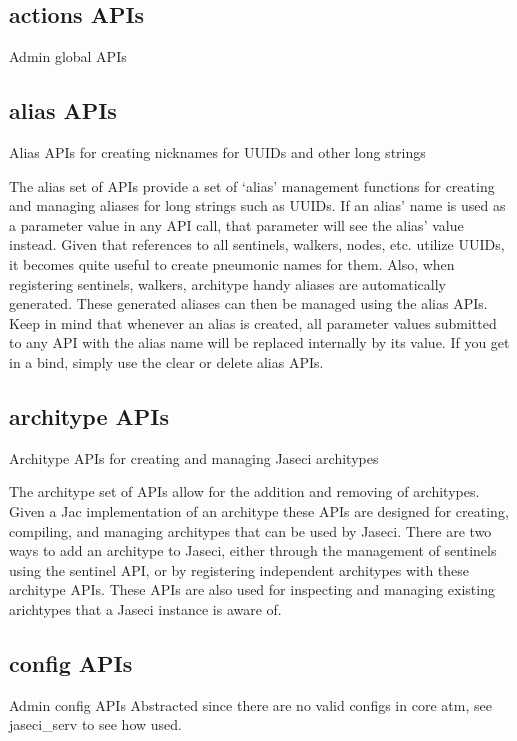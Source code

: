 \subsection{actions APIs}

Admin global APIs

\subsection{alias APIs}

Alias APIs for creating nicknames for UUIDs and other long strings
\par
The alias set of APIs provide a set of `alias' management functions for
creating and managing aliases for long strings such as UUIDs. If an alias'
name is used as a parameter value in any API call, that parameter will see
the alias' value instead. Given that references to all sentinels, walkers,
nodes, etc. utilize UUIDs, it becomes quite useful to create pneumonic
names for them. Also, when registering   sentinels, walkers, architype
handy aliases are automatically generated. These generated aliases can
then be managed using the alias APIs. Keep in mind that whenever an alias
is created, all parameter values submitted to any API with the alias name
will be replaced internally by its value. If you get in a bind, simply use
the clear or delete alias APIs.

\subsection{architype APIs}

Architype APIs for creating and managing Jaseci architypes
\par
The architype set of APIs allow for the addition and removing of
architypes. Given a Jac implementation of an architype these APIs are
designed for creating, compiling, and managing architypes that can be
used by Jaseci. There are two ways to add an architype to Jaseci, either
through the management of sentinels using the sentinel API, or by
registering independent architypes with these architype APIs. These
APIs are also used for inspecting and managing existing arichtypes that
a Jaseci instance is aware of.

\subsection{config APIs}

Admin config APIs
Abstracted since there are no valid configs in core atm, see jaseci\_serv
to see how used.

